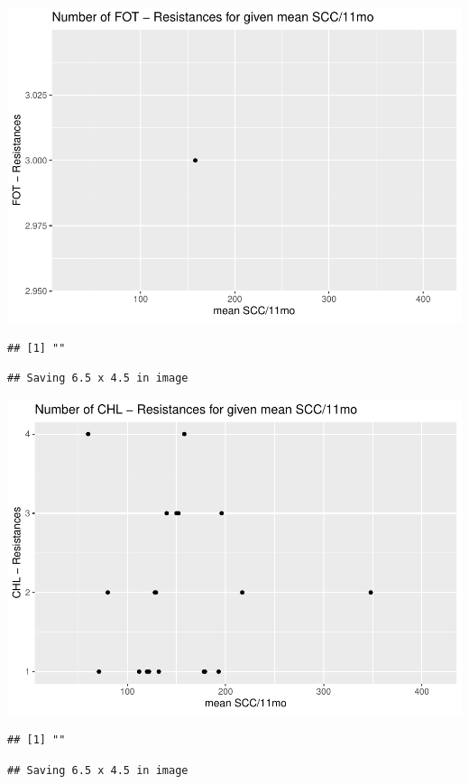 \documentclass[
]{article}
\begin{document}
\includegraphics{NResistenzen_files/figure-latex/numerical_variables-15.pdf}

\begin{verbatim}
## [1] ""
\end{verbatim}

\begin{verbatim}
## Saving 6.5 x 4.5 in image
\end{verbatim}

\includegraphics{NResistenzen_files/figure-latex/numerical_variables-16.pdf}

\begin{verbatim}
## [1] ""
\end{verbatim}

\begin{verbatim}
## Saving 6.5 x 4.5 in image
\end{verbatim}
\end{document}
